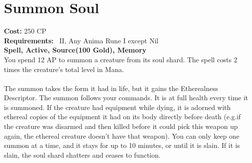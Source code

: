 \section{Summon Soul}
\textbf{Cost:} 250 CP\\
\textbf{Requirements:}~ II, Any Anima Rune I except Nil\\
\textbf{Spell, Active, Source(100 Gold), Memory}\\
You spend 12 AP to summon a creature from its soul shard.
The spell costs 2 times the creature's total level in Mana.\\
\\
The summon takes the form it had in life, but it gains the Etherealness Descriptor.
The summon follows your commands.
It is at full health every time it is summoned.
If the creature had equipment while dying, it is adorned with ethereal copies of the equipment it had on its body directly before death (e.g.if the creature was disarmed and then killed before it could pick this weapon up again, the ethereal creature doesn't have that weapon).
You can only keep one summon at a time, and it stays for up to 10 minutes, or until it is slain.
If it is slain, the soul shard shatters and ceases to function.\\